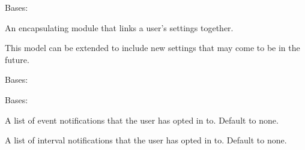 \documentclass[letterpaper,10pt,english]{sphinxmanual}
\begin{document}

\begin{fulllineitems}
\label{modules/webapp:webapp.models.UserSettings}
Bases: 

An encapsulating module that links a user's settings together.

This model can be extended to include new settings that may come to be in the future.

\begin{fulllineitems}
\label{modules/webapp:webapp.models.UserSettings.DoesNotExist}
Bases: 

\end{fulllineitems}


\begin{fulllineitems}
\label{modules/webapp:webapp.models.UserSettings.MultipleObjectsReturned}
Bases: 

\end{fulllineitems}


\begin{fulllineitems}
\label{modules/webapp:webapp.models.UserSettings.event_notification}
A list of event notifications that the user has opted in to. Default to none.

\end{fulllineitems}


\begin{fulllineitems}
\label{modules/webapp:webapp.models.UserSettings.interval_notification}
A list of interval notifications that the user has opted in to. Default to none.

\end{fulllineitems}


\end{fulllineitems}
\end{document}
